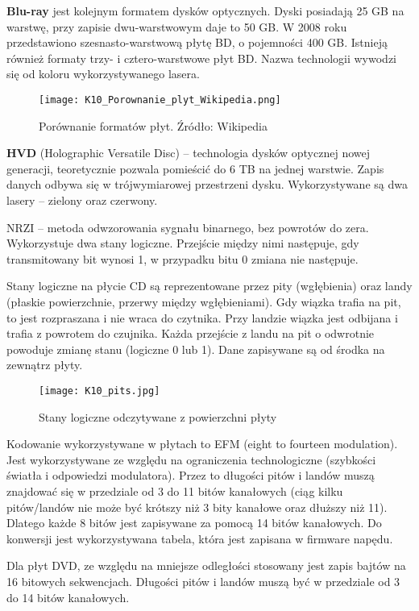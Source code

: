\textbf{Blu-ray} jest kolejnym formatem dysków optycznych. Dyski posiadają 25 GB na warstwę, przy zapisie dwu-warstwowym daje to 50 GB. W 2008 roku przedstawiono szesnasto-warstwową płytę BD, o pojemności 400 GB. Istnieją również formaty trzy- i cztero-warstwowe płyt BD. Nazwa technologii wywodzi się od koloru wykorzystywanego lasera. 

\begin{figure}[H]
	\centering
	\texttt{[image: K10\_Porownanie\_plyt\_Wikipedia.png]}
	\caption{Porównanie formatów płyt. Źródło: Wikipedia}
\end{figure}

\textbf{HVD} (Holographic Versatile Disc) -- technologia dysków optycznej nowej generacji, teoretycznie pozwala pomieścić do 6 TB na jednej warstwie. Zapis danych odbywa się w trójwymiarowej przestrzeni dysku. Wykorzystywane są dwa lasery -- zielony oraz czerwony.

NRZI -- metoda odwzorowania sygnału binarnego, bez powrotów do zera. Wykorzystuje dwa stany logiczne. Przejście między nimi następuje, gdy transmitowany bit wynosi 1, w przypadku bitu 0 zmiana nie następuje.

Stany logiczne na płycie CD są reprezentowane przez pity (wgłębienia) oraz landy (płaskie powierzchnie, przerwy między wgłębieniami). Gdy wiązka trafia na pit, to jest rozpraszana i nie wraca do czytnika. Przy landzie wiązka jest odbijana i trafia z powrotem do czujnika. Każda przejście z landu na pit o odwrotnie powoduje zmianę stanu (logiczne 0 lub 1). Dane zapisywane są od środka na zewnątrz płyty.

\begin{figure}[H]
	\centering
	\texttt{[image: K10\_pits.jpg]}
	\caption{Stany logiczne odczytywane z powierzchni płyty}
\end{figure}

Kodowanie wykorzystywane w płytach to EFM (eight to fourteen modulation). Jest wykorzystywane ze względu na ograniczenia technologiczne (szybkości światła i odpowiedzi modulatora). Przez to długości pitów i landów muszą znajdować się w przedziale od 3 do 11 bitów kanałowych (ciąg kilku pitów/landów nie może być krótszy niż 3 bity kanałowe oraz dłuższy niż 11). Dlatego każde 8 bitów jest zapisywane za pomocą 14 bitów kanałowych. Do konwersji jest wykorzystywana tabela, która jest zapisana w firmware napędu. 

Dla płyt DVD, ze względu na mniejsze odległości stosowany jest zapis bajtów na 16 bitowych sekwencjach. Długości pitów i landów muszą być w przedziale od 3 do 14 bitów kanałowych.

